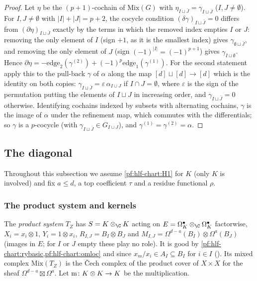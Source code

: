 \begin{proof}
Let $\eta$ be the $(p+1)$-cochain of $\mathrm{Mix}(G)$ with $\eta_{I\sqcup\bar J}=\gamma_{I\sqcup\bar J}$ ($I,J\ne\emptyset$). For $I,J\ne\emptyset$
with $|I|+|J|=p+2$, the cocycle condition $(\delta\gamma)_{I\sqcup\bar J}=0$ differs from $(\partial\eta)_{I\sqcup\bar J}$ exactly by the terms
in which the removed index empties $I$ or $J$: removing the only element of $I$ (sign $+1$, as it is the smallest index) gives $\gamma_{\emptyset\sqcup\bar J}$,
and removing the only element of $J$ (sign $(-1)^{|I|}=(-1)^{p+1}$) gives $\gamma_{I\sqcup\emptyset}$. Hence
$\partial\eta=-\mathrm{edge}_2(\gamma^{(2)})+(-1)^p\mathrm{edge}_1(\gamma^{(1)})$. For the second statement apply this to the pull-back
$\gamma$ of $\alpha$ along the map $[d]\sqcup[d]\to[d]$ which is the identity on both copies: $\gamma_{I\sqcup\bar J}=\varepsilon\,\alpha_{I\cup J}$
if $I\cap J=\emptyset$, where $\varepsilon$ is the sign of the permutation putting the elements of $I\sqcup J$ in increasing order, and
$\gamma_{I\sqcup\bar J}=0$ otherwise. Identifying cochains indexed by subsets with alternating cochains, $\gamma$ is the image of $\alpha$
under the refinement map, which commutes with the differentials; so $\gamma$ is a $p$-cocycle (with $\gamma_{I\sqcup\bar J}\in G_{I\cup J}$),
and $\gamma^{(1)}=\gamma^{(2)}=\alpha$.
\end{proof}

\subsection{The diagonal}\label{pf:hlf-chart:ss:diag}

Throughout this subsection we assume \ref{pf:hlf-chart:H1} for $K$ (only $K$ is involved) and fix $a\le d$, a top coefficient $\tau$ and a residue
functional $\rho$.

\subsubsection*{The product system and kernels}
The \emph{product system} $T_Z$ has $S=K\otimes_\C K$ acting on $E=\Omega^\bullet_K\otimes_\C\Omega^\bullet_K$ factorwise, $X_i=x_i\otimes1$,
$Y_i=1\otimes x_i$, $R_{I,J}=B_I\otimes B_J$ and $M_{I,J}=\Omega^{d-a}(B_I)\otimes\Omega^a(B_J)$ (images in $E$; for $I$ or $J$ empty these play no
role). It is good by \cref{pf:hlf-chart:rybasic,pf:hlf-chart:omloc} and since $x_m/x_i\in A_I\subseteq B_I$ for $i\in I$
(). Its mixed complex $\mathrm{Mix}(T_Z)$ is the \v{C}ech complex of the product cover of
$X\times X$ for the sheaf $\Omega^{d-a}\boxtimes\Omega^a$. Let $\operatorname{m}\colon K\otimes K\to K$ be the multiplication.

